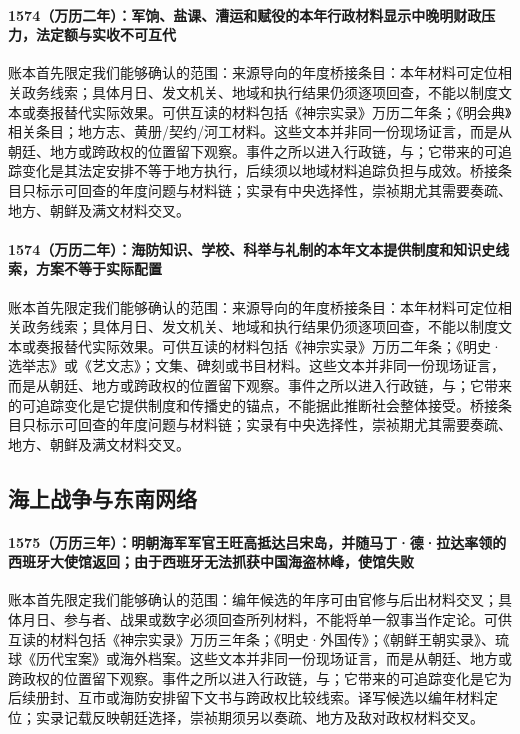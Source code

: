 \paragraph{1574（万历二年）：军饷、盐课、漕运和赋役的本年行政材料显示中晚明财政压力，法定额与实收不可互代} 账本首先限定我们能够确认的范围：来源导向的年度桥接条目：本年材料可定位相关政务线索；具体月日、发文机关、地域和执行结果仍须逐项回查，不能以制度文本或奏报替代实际效果。可供互读的材料包括《神宗实录》万历二年条；《明会典》相关条目；地方志、黄册/契约/河工材料。这些文本并非同一份现场证言，而是从朝廷、地方或跨政权的位置留下观察。事件之所以进入行政链，与；它带来的可追踪变化是其法定安排不等于地方执行，后续须以地域材料追踪负担与成效。桥接条目只标示可回查的年度问题与材料链；实录有中央选择性，崇祯期尤其需要奏疏、地方、朝鲜及满文材料交叉。

\paragraph{1574（万历二年）：海防知识、学校、科举与礼制的本年文本提供制度和知识史线索，方案不等于实际配置} 账本首先限定我们能够确认的范围：来源导向的年度桥接条目：本年材料可定位相关政务线索；具体月日、发文机关、地域和执行结果仍须逐项回查，不能以制度文本或奏报替代实际效果。可供互读的材料包括《神宗实录》万历二年条；《明史·选举志》或《艺文志》；文集、碑刻或书目材料。这些文本并非同一份现场证言，而是从朝廷、地方或跨政权的位置留下观察。事件之所以进入行政链，与；它带来的可追踪变化是它提供制度和传播史的锚点，不能据此推断社会整体接受。桥接条目只标示可回查的年度问题与材料链；实录有中央选择性，崇祯期尤其需要奏疏、地方、朝鲜及满文材料交叉。

\subsection{海上战争与东南网络}

\paragraph{1575（万历三年）：明朝海军军官王旺高抵达吕宋岛，并随马丁·德·拉达率领的西班牙大使馆返回；由于西班牙无法抓获中国海盗林峰，使馆失败} 账本首先限定我们能够确认的范围：编年候选的年序可由官修与后出材料交叉；具体月日、参与者、战果或数字必须回查所列材料，不能将单一叙事当作定论。可供互读的材料包括《神宗实录》万历三年条；《明史·外国传》；《朝鲜王朝实录》、琉球《历代宝案》或海外档案。这些文本并非同一份现场证言，而是从朝廷、地方或跨政权的位置留下观察。事件之所以进入行政链，与；它带来的可追踪变化是它为后续册封、互市或海防安排留下文书与跨政权比较线索。译写候选以编年材料定位；实录记载反映朝廷选择，崇祯期须另以奏疏、地方及敌对政权材料交叉。

